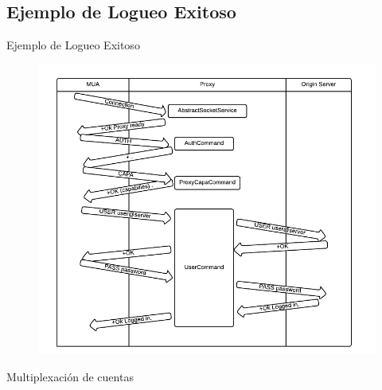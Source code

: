\documentclass{beamer}
\begin{document}
\subsection{Ejemplo de Logueo Exitoso}
\begin{frame}{Ejemplo de Logueo Exitoso}
\begin{figure}[H]
\begin{center}
\includegraphics[scale=0.47]{images/charts/MultiplexadorDeCuentas.png}
\end{center}
\end{figure}
\end{frame}


\begin{frame}
\par Multiplexación de cuentas

\end{frame}
\end{document}
